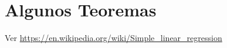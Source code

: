 %
%
%
%
%
%
%
%
%
%
%
%
%
%
\section{Algunos Teoremas}

Ver \url{https://en.wikipedia.org/wiki/Simple_linear_regression}

